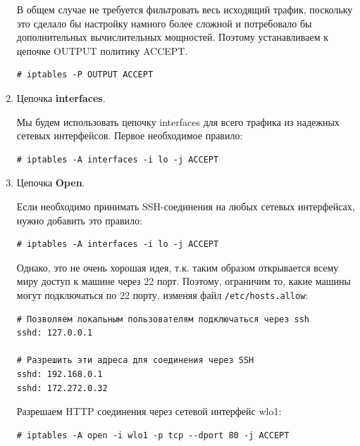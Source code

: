 \documentclass[a4paper]{article}
\begin{document}
\begin{enumerate}
				В общем случае не требуется фильтровать весь исходящий трафик, поскольку это сделало бы настройку намного более сложной и потребовало бы дополнительных вычислительных мощностей. Поэтому устанавливаем к цепочке OUTPUT политику ACCEPT.
				\begin{verbatim}
# iptables -P OUTPUT ACCEPT
				\end{verbatim}
				
			\item Цепочка \textbf{interfaces}.
			
				Мы будем использовать цепочку interfaces для всего трафика из надежных сетевых интерфейсов. Первое необходимое правило:		
				\begin{verbatim}
# iptables -A interfaces -i lo -j ACCEPT
				\end{verbatim}	
				
			\item Цепочка \textbf{Open}.
			
				Если необходимо принимать SSH-соединения на любых сетевых интерфейсах, нужно добавить это правило:	
				\begin{verbatim}
# iptables -A interfaces -i lo -j ACCEPT
				\end{verbatim}
				Однако, это не очень хорошая идея, т.к. таким образом открывается всему миру доступ к машине через 22 порт. Поэтому, ограничим то, какие машины могут подключаться по 22 порту, изменяя файл \texttt{/etc/hosts.allow}:	
				\begin{verbatim}
# Позволяем локальным пользователям подключаться через ssh
sshd: 127.0.0.1

# Разрешить эти адреса для соединения через SSH
sshd: 192.168.0.1
sshd: 172.272.0.32
				\end{verbatim}
				Разрешаем HTTP соединения через сетевой интерфейс wlo1:
				\begin{verbatim}
# iptables -A open -i wlo1 -p tcp --dport 80 -j ACCEPT
				\end{verbatim}
				
	\end{enumerate}
	
\end{document}
